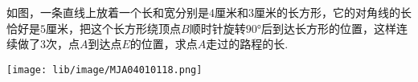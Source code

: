 如图，一条直线上放着一个长和宽分别是$4$厘米和$3$厘米的长方形，它的对角线的长恰好是$5$厘米，把这个长方形绕顶点$B$顺时针旋转$90°$后到达长方形的位置，这样连续做了$3$次，点$A$到达点$E$的位置，求点$A$走过的路程的长.
\begin{center}
    \texttt{[image: lib/image/MJA04010118.png]}
\end{center}